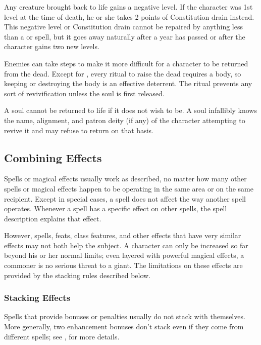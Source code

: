  Any creature brought back to life gains a negative level. If the character was 1st level at the time of death, he or she takes 2 points of Constitution drain instead. This negative level or Constitution drain cannot be repaired by anything less than a  or  spell, but it goes away naturally after a year has passed or after the character gains two new levels.

 Enemies can take steps to make it more difficult for a character to be returned from the dead. Except for , every ritual to raise the dead requires a body, so keeping or destroying the body is an effective deterrent. The  ritual prevents any sort of revivification unless the soul is first released.

 A soul cannot be returned to life if it does not wish to be. A soul infallibly knows the name, alignment, and patron deity (if any) of the character attempting to revive it and may refuse to return on that basis.


\subsection{Combining Effects}
Spells or magical effects usually work as described, no matter how many other spells or magical effects happen to be operating in the same area or on the same recipient. Except in special cases, a spell does not affect the way another spell operates. Whenever a spell has a specific effect on other spells, the spell description explains that effect.

However, spells, feats, class features, and other effects that have very similar effects may not both help the subject. A character can only be increased so far beyond his or her normal limits; even layered with powerful magical effects, a commoner is no serious threat to a giant. The limitations on these effects are provided by the stacking rules described below.

\subsubsection{Stacking Effects}
Spells that provide bonuses or penalties usually do not stack with themselves. More generally, two enhancement bonuses don't stack even if they come from different spells; see , for more details.

